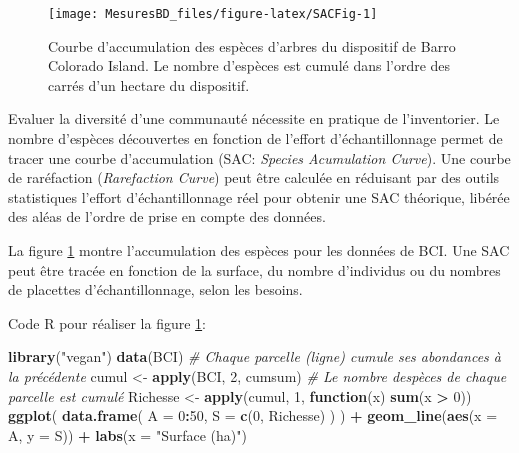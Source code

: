\documentclass[
  11pt,
  american,
  a4paper,
  extrafontsizes,onecolumn,openright
  ]{memoir}
\newenvironment{Shaded}{\begin{snugshade}}{\end{snugshade}}
\newcommand{\AttributeTok}[1]{\textcolor[rgb]{0.13,0.29,0.53}{#1}}
\newcommand{\CommentTok}[1]{\textcolor[rgb]{0.56,0.35,0.01}{\textit{#1}}}
\newcommand{\ControlFlowTok}[1]{\textcolor[rgb]{0.13,0.29,0.53}{\textbf{#1}}}
\newcommand{\DecValTok}[1]{\textcolor[rgb]{0.00,0.00,0.81}{#1}}
\newcommand{\FunctionTok}[1]{\textcolor[rgb]{0.13,0.29,0.53}{\textbf{#1}}}
\newcommand{\NormalTok}[1]{#1}
\newcommand{\OtherTok}[1]{\textcolor[rgb]{0.56,0.35,0.01}{#1}}
\newcommand{\SpecialCharTok}[1]{\textcolor[rgb]{0.81,0.36,0.00}{\textbf{#1}}}
\newcommand{\StringTok}[1]{\textcolor[rgb]{0.31,0.60,0.02}{#1}}
\newlength{\rf}
\begin{document}
\scriptsize

\begin{figure}

{\centering \texttt{[image: MesuresBD\_files/figure-latex/SACFig-1]} 

}

\caption{Courbe d'accumulation des espèces d'arbres du dispositif de Barro Colorado Island. Le nombre d'espèces est cumulé dans l'ordre des carrés d'un hectare du dispositif.}\label{fig:SACFig}
\end{figure}

\normalsize

Evaluer la diversité d'une communauté nécessite en pratique de l'inventorier.
Le nombre d'espèces découvertes en fonction de l'effort d'échantillonnage permet de tracer une courbe d'accumulation (SAC: \emph{Species Acumulation Curve}).
Une courbe de raréfaction (\emph{Rarefaction Curve}) peut être calculée en réduisant par des outils statistiques l'effort d'échantillonnage réel pour obtenir une SAC théorique, libérée des aléas de l'ordre de prise en compte des données.

La figure \ref{fig:SACFig} montre l'accumulation des espèces pour les données de BCI.
Une SAC peut être tracée en fonction de la surface, du nombre d'individus ou du nombres de placettes d'échantillonnage, selon les besoins.

Code R pour réaliser la figure \ref{fig:SACFig}:

\scriptsize

\begin{Shaded}
\begin{Highlighting}[]
\FunctionTok{library}\NormalTok{(}\StringTok{"vegan"}\NormalTok{)}
\FunctionTok{data}\NormalTok{(BCI)}
\CommentTok{\# Chaque parcelle (ligne) cumule ses abondances à la précédente}
\NormalTok{cumul }\OtherTok{\textless{}{-}} \FunctionTok{apply}\NormalTok{(BCI, }\DecValTok{2}\NormalTok{, cumsum)}
\CommentTok{\# Le nombre d\textquotesingle{}espèces de chaque parcelle est cumulé }
\NormalTok{Richesse }\OtherTok{\textless{}{-}} \FunctionTok{apply}\NormalTok{(cumul, }\DecValTok{1}\NormalTok{, }\ControlFlowTok{function}\NormalTok{(x) }\FunctionTok{sum}\NormalTok{(x }\SpecialCharTok{\textgreater{}} \DecValTok{0}\NormalTok{))}
\FunctionTok{ggplot}\NormalTok{(}
  \FunctionTok{data.frame}\NormalTok{(}
    \AttributeTok{A =} \DecValTok{0}\SpecialCharTok{:}\DecValTok{50}\NormalTok{, }
    \AttributeTok{S =} \FunctionTok{c}\NormalTok{(}\DecValTok{0}\NormalTok{, Richesse)}
\NormalTok{  )}
\NormalTok{) }\SpecialCharTok{+}
  \FunctionTok{geom\_line}\NormalTok{(}\FunctionTok{aes}\NormalTok{(}\AttributeTok{x =}\NormalTok{ A, }\AttributeTok{y =}\NormalTok{ S)) }\SpecialCharTok{+}
  \FunctionTok{labs}\NormalTok{(}\AttributeTok{x =} \StringTok{"Surface (ha)"}\NormalTok{)}
\end{Highlighting}
\end{Shaded}
\end{document}
